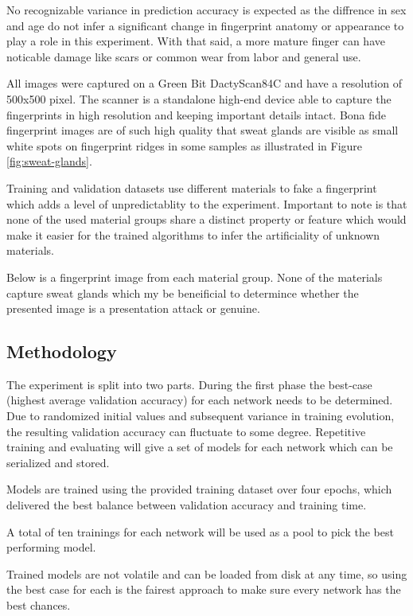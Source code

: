 No recognizable variance in prediction accuracy is expected as the diffrence in sex and age do not infer a significant change in fingerprint anatomy or appearance to play a role in this experiment.
With that said, a more mature finger can have noticable damage like scars or common wear from labor and general use.

All images were captured on a Green Bit DactyScan84C and have a resolution of 500x500 pixel.
The scanner is a standalone high-end device able to capture the fingerprints in high resolution and keeping important details intact.
Bona fide fingerprint images are of such high quality that sweat glands are visible as small white spots on fingerprint ridges in some samples as illustrated in Figure \ref{fig:sweat-glands}.

Training and validation datasets use different materials to fake a fingerprint which adds a level of unpredictablity to the experiment.
Important to note is that none of the used material groups share a distinct property or feature which would make it easier for the trained algorithms to infer the artificiality of unknown materials.

Below is a fingerprint image from each material group.
None of the materials capture sweat glands which my be beneificial to determince whether the presented image is a presentation attack or genuine.





\subsection{Methodology}
The experiment is split into two parts.
During the first phase the best-case (highest average validation accuracy) for each network needs to be determined.
Due to randomized initial values and subsequent variance in training evolution, the resulting validation accuracy can fluctuate to some degree.
Repetitive training and evaluating will give a set of models for each network which can be serialized and stored.

Models are trained using the provided training dataset over four epochs, which delivered the best balance between validation accuracy and training time.

A total of ten trainings for each network will be used as a pool to pick the best performing model.

Trained models are not volatile and can be loaded from disk at any time, so using the best case for each is the fairest approach to make sure every network has the best chances.

